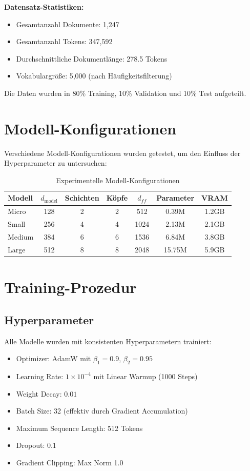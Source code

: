 \textbf{Datensatz-Statistiken:}
\begin{itemize}
    \item Gesamtanzahl Dokumente: 1,247
    \item Gesamtanzahl Tokens: 347,592
    \item Durchschnittliche Dokumentlänge: 278.5 Tokens
    \item Vokabulargröße: 5,000 (nach Häufigkeitsfilterung)
\end{itemize}

Die Daten wurden in 80\% Training, 10\% Validation und 10\% Test aufgeteilt.

\section{Modell-Konfigurationen}

Verschiedene Modell-Konfigurationen wurden getestet, um den Einfluss der Hyperparameter zu untersuchen:

\begin{table}[h]
\centering
\begin{tabular}{|l|c|c|c|c|c|c|}
\hline
\textbf{Modell} & \textbf{$d_{\text{model}}$} & \textbf{Schichten} & \textbf{Köpfe} & \textbf{$d_{ff}$} & \textbf{Parameter} & \textbf{VRAM} \\
\hline
Micro & 128 & 2 & 2 & 512 & 0.39M & 1.2GB \\
Small & 256 & 4 & 4 & 1024 & 2.13M & 2.1GB \\
Medium & 384 & 6 & 6 & 1536 & 6.84M & 3.8GB \\
Large & 512 & 8 & 8 & 2048 & 15.75M & 5.9GB \\
\hline
\end{tabular}
\caption{Experimentelle Modell-Konfigurationen}
\label{tab:model_configurations}
\end{table}

\section{Training-Prozedur}

\subsection{Hyperparameter}

Alle Modelle wurden mit konsistenten Hyperparametern trainiert:

\begin{itemize}
    \item Optimizer: AdamW mit $\beta_1 = 0.9$, $\beta_2 = 0.95$
    \item Learning Rate: $1 \times 10^{-4}$ mit Linear Warmup (1000 Steps)
    \item Weight Decay: $0.01$
    \item Batch Size: 32 (effektiv durch Gradient Accumulation)
    \item Maximum Sequence Length: 512 Tokens
    \item Dropout: 0.1
    \item Gradient Clipping: Max Norm 1.0
\end{itemize}

